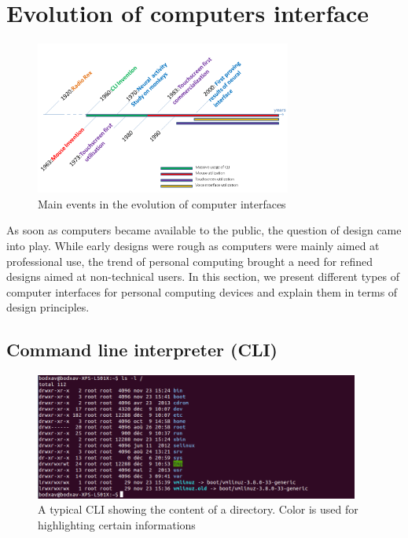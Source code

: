 \documentclass[a4paper,11pt] {article}
\theoremstyle{definition}
\begin{document}
\newpage

\section{Evolution of computers interface}
\label{sct:history}

    \begin{figure}[h]
        \centering
        \includegraphics[width=0.75\textwidth]{fig-report/timeline-interface_2.png}
        \caption{Main events in the evolution of computer interfaces}
        \label{fig:timeline}
    \end{figure}

    As soon as computers became available to the public, the question of design came into play. While early designs were rough as computers were mainly aimed at professional use, the trend of personal computing brought a need for refined designs aimed at non-technical users. In this section, we present different types of computer interfaces for personal computing devices and explain them in terms of design principles.

    \subsection{Command line interpreter (CLI)}

    \begin{figure}[h]
        \centering
        \includegraphics[width=0.95\textwidth]{fig-report/terminal.png}
        \caption{A typical CLI showing the content of a directory. Color is used for highlighting certain informations}
        \label{fig:cli}
    \end{figure}
\end{document}
